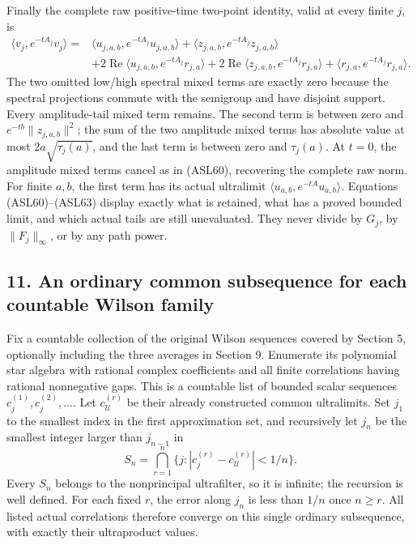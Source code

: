 \documentclass[11pt]{article}
\begin{document}
Finally the complete raw positive-time two-point identity, valid at every finite \(j\), is
\[
\begin{aligned}
 \langle v_j,e^{-tA_j}v_j\rangle
 ={}&\langle u_{j,a,b},e^{-tA_j}u_{j,a,b}\rangle
   +\langle z_{j,a,b},e^{-tA_j}z_{j,a,b}\rangle\\
 &+2\operatorname{Re}\langle u_{j,a,b},e^{-tA_j}r_{j,a}\rangle
  +2\operatorname{Re}\langle z_{j,a,b},e^{-tA_j}r_{j,a}\rangle
  +\langle r_{j,a},e^{-tA_j}r_{j,a}\rangle .
\end{aligned}\tag{ASL63}
\]
The two omitted low/high spectral mixed terms are exactly zero because the spectral projections commute with the semigroup and have disjoint support. Every amplitude-tail mixed term remains. The second term is between zero and \(e^{-tb}\|z_{j,a,b}\|^2\); the sum of the two amplitude mixed terms has absolute value at most \(2a\sqrt{\tau_j(a)}\), and the last term is between zero and \(\tau_j(a)\). At \(t=0\), the amplitude mixed terms cancel as in (ASL60), recovering the complete raw norm. For finite \(a,b\), the first term has its actual ultralimit \(\langle u_{a,b},e^{-tA}u_{a,b}\rangle\). Equations (ASL60)–(ASL63) display exactly what is retained, what has a proved bounded limit, and which actual tails are still unevaluated. They never divide by \(G_j\), by \(\|F_j\|_\infty\), or by any path power.

\subsection*{11. An ordinary common subsequence for each countable Wilson family}

Fix a countable collection of the original Wilson sequences covered by Section 5, optionally including the three averages in Section 9. Enumerate its polynomial star algebra with rational complex coefficients and all finite correlations having rational nonnegative gaps. This is a countable list of bounded scalar sequences \(c_j^{(1)},c_j^{(2)},\ldots\). Let \(c_{\mathcal U}^{(r)}\) be their already constructed common ultralimits. Set \(j_1\) to the smallest index in the first approximation set, and recursively let \(j_n\) be the smallest integer larger than \(j_{n-1}\) in
\[
 S_n=\bigcap_{r=1}^n\{j:|c_j^{(r)}-c_{\mathcal U}^{(r)}|<1/n\}.
 \tag{ASL64}
\]
Every \(S_n\) belongs to the nonprincipal ultrafilter, so it is infinite; the recursion is well defined. For each fixed \(r\), the error along \(j_n\) is less than \(1/n\) once \(n\ge r\). All listed actual correlations therefore converge on this single ordinary subsequence, with exactly their ultraproduct values.
\end{document}
